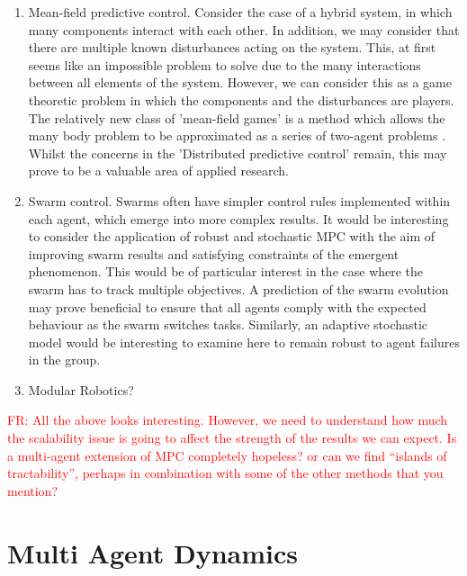\documentclass[preprint,11pt]{report}
\newcommand\fr[1]{\textcolor{red}{FR: #1}}
\begin{document}
\begin{enumerate}
	\item Mean-field predictive control. Consider the case of a hybrid system, in which many components
	interact with each other. In addition, we may consider that there are multiple known disturbances
	acting on the system. This, at first seems like an impossible problem to solve due to the many
	interactions between all elements of the system. However, we can consider this as a game
	theoretic problem in which the components and the disturbances are players. The relatively new
	class of 'mean-field games' is a method which allows the many body problem to be approximated as
	a series of two-agent problems \cite{Yang2018}. Whilst the concerns in the 'Distributed
	predictive control' remain, this may prove to be a valuable area of applied research.
	\item Swarm control. Swarms often have simpler control rules implemented within each agent,
	which emerge into more complex results. It would be interesting to consider the application of
	robust and stochastic MPC with the aim of improving swarm results and satisfying constraints of
	the emergent phenomenon. This would be of particular interest in the case where the swarm has to
	track multiple objectives. A prediction of the swarm evolution may prove beneficial to ensure
	that all agents comply with the expected behaviour as the swarm switches tasks. Similarly, an
	adaptive stochastic model would be interesting to examine here to remain robust to agent
	failures in the group.
	\item Modular Robotics?
\end{enumerate}

\fr{All the above looks interesting. However, we need to understand
  how much the scalability issue is going to affect the strength of
  the results we can expect. Is a multi-agent extension of MPC
  completely hopeless? or can we find ``islands of tractability'',
  perhaps in combination with some of the other methods that you
  mention?}



\section*{Multi Agent Dynamics}
\end{document}

